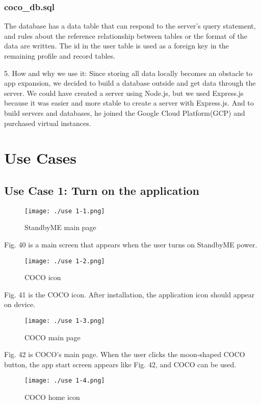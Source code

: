 \documentclass[conference]{IEEEtran}
\begin{document}
\subsubsection{coco\_db.sql}
The database has a data table that can respond to the server's query statement, and rules about the reference relationship between tables or the format of the data are written. The id in the user table is used as a foreign key in the remaining profile and record tables.\break
\par 5. How and why we use it: Since storing all data locally becomes an obstacle to app expansion, we decided to build a database outside and get data through the server. We could have created a server using Node.js, but we used Express.js because it was easier and more stable to create a server with Express.js. And to build servers and databases, he joined the Google Cloud Platform(GCP) and purchased virtual instances.
\break

\section{Use Cases}
\subsection{Use Case 1: Turn on the application}

\begin{figure}[H]
\texttt{[image: ./use 1-1.png]}
\centering
\caption{StandbyME main page}
\end{figure}

Fig. 40 is a main screen that appears when the user turns on StandbyME power.

\begin{figure}[H]
\texttt{[image: ./use 1-2.png]}
\centering
\caption{COCO icon}
\end{figure}

Fig. 41 is the COCO icon. After installation, the application icon should appear on device.

\begin{figure}[H]
\texttt{[image: ./use 1-3.png]}
\centering
\caption{COCO main page}
\end{figure}

Fig. 42 is COCO's main page. When the user clicks the moon-shaped COCO button, the app start screen appears like Fig. 42, and COCO can be used.

\begin{figure}[H]
\texttt{[image: ./use 1-4.png]}
\centering
\caption{COCO home icon}
\end{figure}
\end{document}
